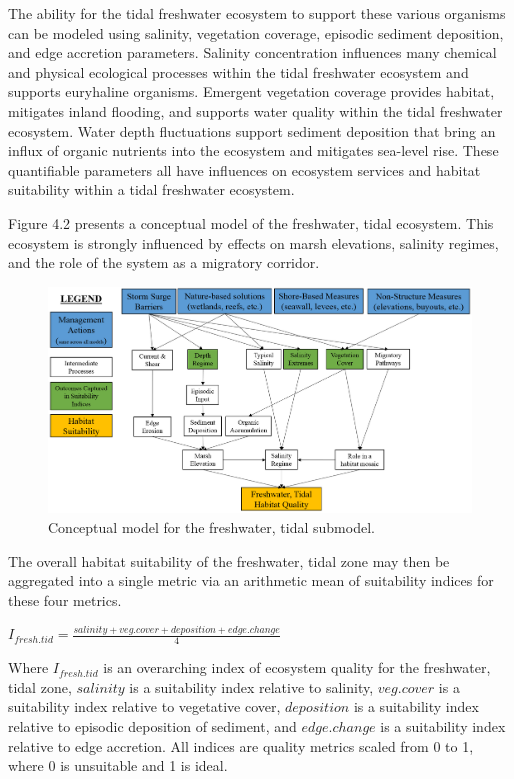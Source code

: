\documentclass[
]{book}
\begin{document}
The ability for the tidal freshwater ecosystem to support these various organisms can be modeled using salinity, vegetation coverage, episodic sediment deposition, and edge accretion parameters. Salinity concentration influences many chemical and physical ecological processes within the tidal freshwater ecosystem and supports euryhaline organisms. Emergent vegetation coverage provides habitat, mitigates inland flooding, and supports water quality within the tidal freshwater ecosystem. Water depth fluctuations support sediment deposition that bring an influx of organic nutrients into the ecosystem and mitigates sea-level rise. These quantifiable parameters all have influences on ecosystem services and habitat suitability within a tidal freshwater ecosystem.

Figure 4.2 presents a conceptual model of the freshwater, tidal ecosystem. This ecosystem is strongly influenced by effects on marsh elevations, salinity regimes, and the role of the system as a migratory corridor.

\begin{figure}
\includegraphics[width=21.58in]{ZZ_Fig04.02_Fresh.Tid_ConModel} \caption{Conceptual model for the freshwater, tidal submodel.}\label{fig:unnamed-chunk-9}
\end{figure}

The overall habitat suitability of the freshwater, tidal zone may then be aggregated into a single metric via an arithmetic mean of suitability indices for these four metrics.

\(I_{fresh.tid} = \frac{salinity + veg.cover + deposition + edge.change}{4}\)

Where \(I_{fresh.tid}\) is an overarching index of ecosystem quality for the freshwater, tidal zone, \(salinity\) is a suitability index relative to salinity, \(veg.cover\) is a suitability index relative to vegetative cover, \(deposition\) is a suitability index relative to episodic deposition of sediment, and \(edge.change\) is a suitability index relative to edge accretion. All indices are quality metrics scaled from 0 to 1, where 0 is unsuitable and 1 is ideal.
\end{document}
